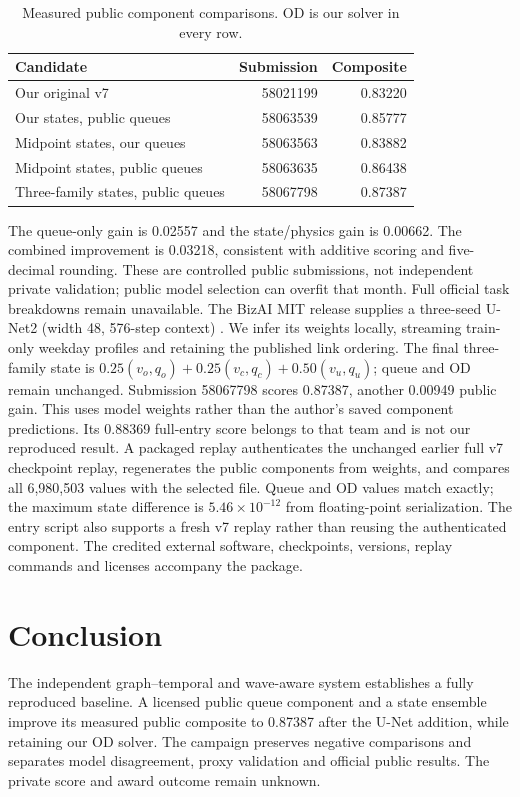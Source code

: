 \documentclass[conference]{IEEEtran}
\begin{document}
\begin{table}[t]
\centering\caption{Measured public component comparisons. OD is our solver in every row.}
\begin{tabular}{lrr}
\hline
Candidate & Submission & Composite\\\hline
Our original v7 & 58021199 & 0.83220\\
Our states, public queues & 58063539 & 0.85777\\
Midpoint states, our queues & 58063563 & 0.83882\\
Midpoint states, public queues & 58063635 & 0.86438\\
Three-family states, public queues & 58067798 & 0.87387\\\hline
\end{tabular}
\end{table}
The queue-only gain is 0.02557 and the state/physics gain is 0.00662.
The combined improvement is 0.03218, consistent with additive scoring and
five-decimal rounding. These are controlled public submissions, not independent
private validation; public model selection can overfit that month. Full official
task breakdowns remain unavailable. The BizAI MIT release supplies a three-seed U-Net2 (width 48, 576-step context) \cite{bizai}. We infer its weights locally, streaming train-only weekday profiles and retaining the published link ordering. The final three-family state is $0.25(v_o,q_o)+0.25(v_c,q_c)+0.50(v_u,q_u)$; queue and OD remain unchanged. Submission 58067798 scores 0.87387, another 0.00949 public gain. This uses model weights rather than the author's saved component predictions. Its 0.88369 full-entry score belongs to that team and is not our reproduced result. A packaged replay authenticates the unchanged earlier full v7 checkpoint replay, regenerates the public components from weights, and compares all 6,980,503 values with the selected file. Queue and OD values match exactly; the maximum state difference is $5.46\times10^{-12}$ from floating-point serialization. The entry script also supports a fresh v7 replay rather than reusing the authenticated component. The credited external software, checkpoints,
versions, replay commands and licenses accompany the package.

\section{Conclusion}
The independent graph--temporal and wave-aware system establishes a fully
reproduced baseline. A licensed public queue component and a state ensemble
improve its measured public composite to 0.87387 after the U-Net addition, while retaining our OD solver.
The campaign preserves negative comparisons and separates model disagreement,
proxy validation and official public results. The private score and award
outcome remain unknown.
\end{document}
